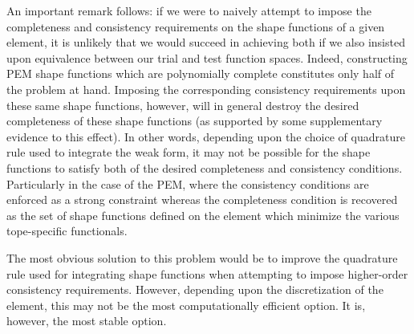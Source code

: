 \documentclass[11pt]{article} %
\begin{document}
An important remark follows: if we were to naively attempt to impose the completeness and consistency requirements on the shape functions of a given element, it is unlikely that we would succeed in achieving both if we also insisted upon equivalence between our trial and test function spaces. Indeed, constructing PEM shape functions which are polynomially complete constitutes only half of the problem at hand. Imposing the corresponding consistency requirements upon these same shape functions, however, will in general destroy the desired completeness of these shape functions (as supported by some supplementary evidence to this effect). In other words, depending upon the choice of quadrature rule used to integrate the weak form, it may not be possible for the shape functions to satisfy both of the desired completeness and consistency conditions. Particularly in the case of the PEM, where the consistency conditions are enforced as a strong constraint whereas the completeness condition is recovered as the set of shape functions defined on the element which minimize the various tope-specific functionals.

The most obvious solution to this problem would be to improve the quadrature rule used for integrating shape functions when attempting to impose higher-order consistency requirements. However, depending upon the discretization of the element, this may not be the most computationally efficient option. It is, however, the most stable option.
\end{document}

